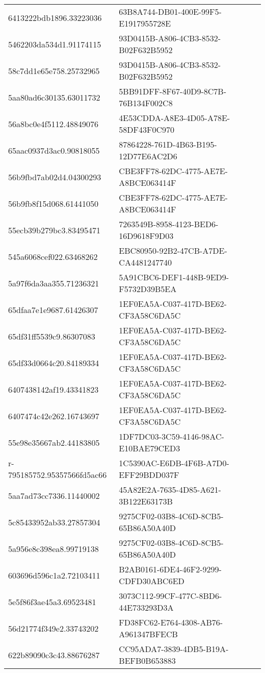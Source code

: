 \begin{tabular}{ll}
6413222bdb1896.33223036 & 63B8A744-DB01-400E-99F5-E1917955728E \\
5462203da534d1.91174115 & 93D0415B-A806-4CB3-8532-B02F632B5952 \\
58c7dd1e65e758.25732965 & 93D0415B-A806-4CB3-8532-B02F632B5952 \\
5aa80ad6c30135.63011732 & 5BB91DFF-8F67-40D9-8C7B-76B134F002C8 \\
56a8bc0e4f5112.48849076 & 4E53CDDA-A8E3-4D05-A78E-58DF43F0C970 \\
65aac0937d3ac0.90818055 & 87864228-761D-4B63-B195-12D77E6AC2D6 \\
56b9fbd7ab02d4.04300293 & CBE3FF78-62DC-4775-AE7E-A8BCE063414F \\
56b9fb8f15d068.61441050 & CBE3FF78-62DC-4775-AE7E-A8BCE063414F \\
55ecb39b279bc3.83495471 & 7263549B-8958-4123-BED6-16D9618F9D03 \\
545a6068cef022.63468262 & EBC80950-92B2-47CB-A7DE-CA4481247740 \\
5a97f6da3aa355.71236321 & 5A91CBC6-DEF1-448B-9ED9-F5732D39B5EA \\
65dfaa7e1e9687.61426307 & 1EF0EA5A-C037-417D-BE62-CF3A58C6DA5C \\
65df31ff5539c9.86307083 & 1EF0EA5A-C037-417D-BE62-CF3A58C6DA5C \\
65df33d0664c20.84189334 & 1EF0EA5A-C037-417D-BE62-CF3A58C6DA5C \\
6407438142af19.43341823 & 1EF0EA5A-C037-417D-BE62-CF3A58C6DA5C \\
6407474c42e262.16743697 & 1EF0EA5A-C037-417D-BE62-CF3A58C6DA5C \\
55e98e35667ab2.44183805 & 1DF7DC03-3C59-4146-98AC-E10BAE79CED3 \\
r-795185752.95357566fd5ac66 & 1C5390AC-E6DB-4F6B-A7D0-EFF29BDD037F \\
5aa7ad73cc7336.11440002 & 45A82E2A-7635-4D85-A621-3B122E63173B \\
5c85433952ab33.27857304 & 9275CF02-03B8-4C6D-8CB5-65B86A50A40D \\
5a956e8c398ea8.99719138 & 9275CF02-03B8-4C6D-8CB5-65B86A50A40D \\
603696d596c1a2.72103411 & B2AB0161-6DE4-46F2-9299-CDFD30ABC6ED \\
5e5f86f3ae45a3.69523481 & 3073C112-99CF-477C-8BD6-44E733293D3A \\
56d21774f349e2.33743202 & FD38FC62-E764-4308-AB76-A961347BFECB \\
622b89090c3c43.88676287 & CC95ADA7-3839-4DB5-B19A-BEFB0B653883 \\

\end{tabular}
